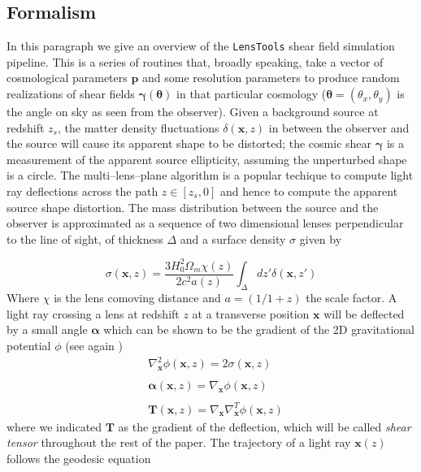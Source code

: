 \documentclass[reprint,aps,prd,superscriptaddress,showkeys,showpacs]{revtex4-1}
\newcommand{\bb}[1]{\mathbf{#1}}
\newcommand{\LT}{\texttt{LensTools} }
\begin{document}
\subsection{Formalism}
%
In this paragraph we give an overview of the \LT shear field simulation pipeline. This is a series of routines that, broadly speaking, take a vector of cosmological parameters $\bb{p}$ and some resolution parameters to produce random realizations of shear fields $\pmb{\gamma}(\pmb{\theta})$ in that particular cosmology ($\pmb{\theta}=(\theta_x,\theta_y)$ is the angle on sky as seen from the observer). Given a background source at redshift $z_s$, the matter density fluctuations $\delta(\bb{x},z)$ in between the observer and the source will cause its apparent shape to be distorted; the cosmic shear $\pmb{\gamma}$ is a measurement of the apparent source ellipticity, assuming the unperturbed shape is a circle. The multi--lens--plane algorithm \citep{RayTracingHartlap} is a popular techique to compute light ray deflections across the path $z\in[z_s,0]$ and hence to compute the apparent source shape distortion. The mass distribution between the source and the observer is approximated as a sequence of two dimensional lenses perpendicular to the line of sight, of thickness $\Delta$ and a surface density $\sigma$ given by 

\begin{equation}
\label{surfacedensity}
\sigma(\bb{x},z) = \frac{3H_0^2\Omega_m\chi(z)}{2c^2a(z)}\int_\Delta dz'\delta(\bb{x},z')
\end{equation}
%
Where $\chi$ is the lens comoving distance and $a=(1/1+z)$ the scale factor. A light ray crossing a lens at redshift $z$ at a transverse position $\bb{x}$ will be deflected by a small angle $\pmb{\alpha}$ which can be shown to be the gradient of the 2D gravitational potential $\phi$ (see again \citep{RayTracingHartlap}) 
%
\begin{equation}
\label{poisson}
\begin{matrix}
& \nabla^2_\bb{x} \phi(\bb{x},z) = 2\sigma(\bb{x},z) \\ \\
& \pmb{\alpha}(\bb{x},z) = \nabla_\bb{x} \phi(\bb{x},z) \\ \\
& \bb{T}(\bb{x},z) = \nabla_\bb{x}\nabla_\bb{x}^T \phi(\bb{x},z)
\end{matrix}
\end{equation}
%
where we indicated $\bb{T}$ as the gradient of the deflection, which will be called \textit{shear tensor} throughout the rest of the paper. The trajectory of a light ray $\bb{x}(z)$ follows the geodesic equation
\end{document}
